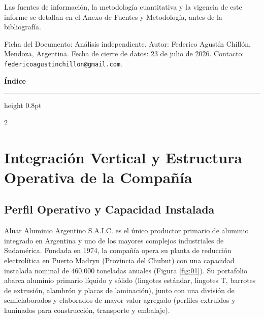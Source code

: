 \documentclass[11pt,a4paper]{article}
\begin{document}
\vspace{0.15cm}
\noindent
{\scriptsize \color{gsgray} \raggedright Las fuentes de información, la metodología cuantitativa y la vigencia de este informe se detallan en el Anexo de Fuentes y Metodología, antes de la bibliografía.\par}

\vfill
\noindent
{\scriptsize \color{gsgray} \raggedright Ficha del Documento: Análisis independiente. Autor: Federico Agustín Chillón. Mendoza, Argentina. Fecha de cierre de datos: 23 de julio de 2026. Contacto: \texttt{federicoagustinchillon@gmail.com}.\par}

\clearpage


\begin{center}
    {\Large\georgiahead\bfseries\color{black} Índice}
\end{center}
\vspace{-0.2cm}
\hrule height 0.8pt
\vspace{0.15cm}

\begin{multicols}{2}
\footnotesize
\makeatletter
{}
\makeatother
\end{multicols}

\clearpage

\section{Integración Vertical y Estructura Operativa de la Compañía}

\subsection{Perfil Operativo y Capacidad Instalada}
Aluar Aluminio Argentino S.A.I.C. es el único productor primario de aluminio integrado en Argentina y uno de los mayores complejos industriales de Sudamérica. Fundada en 1974, la compañía opera su planta de reducción electrolítica en Puerto Madryn (Provincia del Chubut) con una capacidad instalada nominal de 460.000 toneladas anuales (Figura \ref{fig:01}). Su portafolio abarca aluminio primario líquido y sólido (lingotes estándar, lingotes T, barrotes de extrusión, alambrón y placas de laminación), junto con una división de semielaborados y elaborados de mayor valor agregado (perfiles extruidos y laminados para construcción, transporte y embalaje). 
\end{document}
